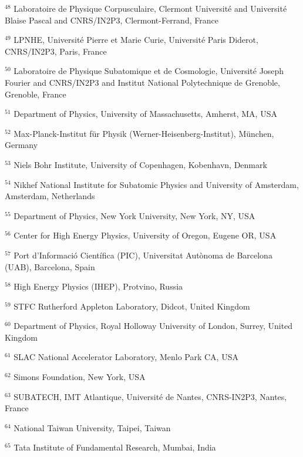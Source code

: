\par {\footnotesize $^{48}$ Laboratoire de Physique Corpusculaire, Clermont Université and Université Blaise Pascal and CNRS/IN2P3, Clermont-Ferrand, France}
\par {\footnotesize $^{49}$ LPNHE, Université Pierre et Marie Curie, Université Paris Diderot, CNRS/IN2P3, Paris, France}
\par {\footnotesize $^{50}$ Laboratoire de Physique Subatomique et de Cosmologie, Université Joseph Fourier and CNRS/IN2P3 and Institut National Polytechnique de Grenoble, Grenoble, France}
\par {\footnotesize $^{51}$ Department of Physics, University of Massachusetts, Amherst, MA, USA}
\par {\footnotesize $^{52}$ Max-Planck-Institut für Physik (Werner-Heisenberg-Institut), München, Germany}
\par {\footnotesize $^{53}$ Niels Bohr Institute, University of Copenhagen, Kobenhavn, Denmark}
\par {\footnotesize $^{54}$ Nikhef National Institute for Subatomic Physics and University of Amsterdam, Amsterdam, Netherlands}
\par {\footnotesize $^{55}$ Department of Physics, New York University, New York, NY, USA}
\par {\footnotesize $^{56}$ Center for High Energy Physics, University of Oregon, Eugene OR, USA}
\par {\footnotesize $^{57}$ Port d’Informació Científica (PIC), Universitat Autònoma de Barcelona (UAB), Barcelona, Spain}
\par {\footnotesize $^{58}$ High Energy Physics (IHEP), Protvino, Russia}
\par {\footnotesize $^{59}$ STFC Rutherford Appleton Laboratory, Didcot, United Kingdom}
\par {\footnotesize $^{60}$ Department of Physics, Royal Holloway University of London, Surrey, United Kingdom}
\par {\footnotesize $^{61}$ SLAC National Accelerator Laboratory, Menlo Park CA, USA}
\par {\footnotesize $^{62}$ Simons Foundation, New York, USA}
\par {\footnotesize $^{63}$ SUBATECH, IMT Atlantique, Université de Nantes, CNRS-IN2P3, Nantes, France}
\par {\footnotesize $^{64}$ National Taiwan University, Taipei, Taiwan}
\par {\footnotesize $^{65}$ Tata Institute of Fundamental Research, Mumbai, India}
